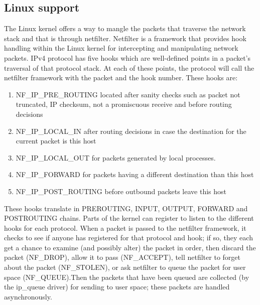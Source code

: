 {{\subsection{Linux support}
\label{sub-sec:nat-linux}
The Linux kernel offers a way to mangle the packets that traverse the network stack and that is through netfilter. Netfilter is a framework that provides hook handling within the Linux kernel for intercepting and manipulating network packets. IPv4 protocol has five hooks which are well-defined points in a packet's traversal of that protocol stack. At each of these points, the protocol will call the netfilter framework with the packet and the hook number.
These hooks are:
\begin{enumerate}
\item NF_IP_PRE_ROUTING located after sanity checks such as packet not truncated, IP checksum, not a promiscuous receive and before routing decisions 
\item NF_IP_LOCAL_IN after routing decisions in case the destination for the current packet is this host
\item NF_IP_LOCAL_OUT for packets generated by local processes. 
\item NF_IP_FORWARD for packets having a different destination than this host
\item NF_IP_POST_ROUTING before outbound packets leave this host 
\end{enumerate}
These hooks translate in PREROUTING, INPUT, OUTPUT, FORWARD and POSTROUTING chains.
Parts of the kernel can register to listen to the different hooks for each protocol. When a packet is passed to the netfilter framework, it checks to see if anyone has registered for that protocol and hook; if so, they each get a chance to examine (and possibly alter) the packet in order, then discard the packet (NF_DROP), allow it to pass (NF_ACCEPT), tell netfilter to forget about the packet (NF_STOLEN), or ask netfilter to queue the packet for user space (NF_QUEUE).Then the packets that have been queued are collected (by the ip_queue driver) for sending to user space; these packets are handled asynchronously.

}}
